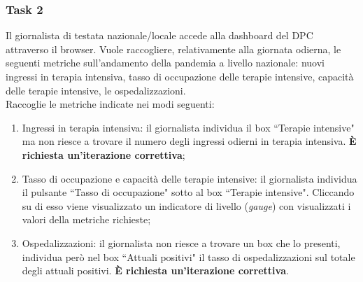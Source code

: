 \subsubsection{Task 2}
\label{sss:cw-task-2}

Il giornalista di testata nazionale/locale accede alla dashboard del DPC attraverso il browser.
Vuole raccogliere, relativamente alla giornata odierna, le seguenti metriche sull'andamento della pandemia a livello nazionale: nuovi ingressi in terapia intensiva, tasso di occupazione delle terapie intensive, capacità delle terapie intensive, le ospedalizzazioni.\\
Raccoglie le metriche indicate nei modi seguenti:
\begin{enumerate}[label=\alph*.]
    \item Ingressi in terapia intensiva: il giornalista individua il box ``Terapie intensive" ma non riesce a trovare il numero degli ingressi odierni in terapia intensiva. \textbf{È richiesta un'iterazione correttiva}; \label{cw2:a}
    \item Tasso di occupazione e capacità delle terapie intensive: il giornalista individua il pulsante ``Tasso di occupazione" sotto al box ``Terapie intensive". Cliccando su di esso viene visualizzato un indicatore di livello (\textit{gauge}) con visualizzati i valori della metriche richieste; \label{cw2:b}
    \item Ospedalizzazioni: il giornalista non riesce a trovare un box che lo presenti, individua però nel box ``Attuali positivi" il tasso di ospedalizzazioni sul totale degli attuali positivi. \textbf{È richiesta un'iterazione correttiva}. \label{cw2:c}
\end{enumerate}

